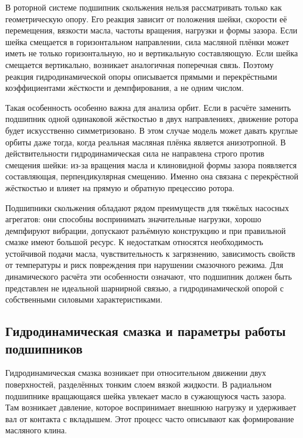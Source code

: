 В роторной системе подшипник скольжения нельзя рассматривать только как геометрическую опору. Его реакция зависит от положения шейки, скорости её перемещения, вязкости масла, частоты вращения, нагрузки и формы зазора. Если шейка смещается в горизонтальном направлении, сила масляной плёнки может иметь не только горизонтальную, но и вертикальную составляющую. Если шейка смещается вертикально, возникает аналогичная поперечная связь. Поэтому реакция гидродинамической опоры описывается прямыми и перекрёстными коэффициентами жёсткости и демпфирования, а не одним числом.

Такая особенность особенно важна для анализа орбит. Если в расчёте заменить подшипник одной одинаковой жёсткостью в двух направлениях, движение ротора будет искусственно симметризовано. В этом случае модель может давать круглые орбиты даже тогда, когда реальная масляная плёнка является анизотропной. В действительности гидродинамическая сила не направлена строго против смещения шейки: из-за вращения масла и клиновидной формы зазора появляется составляющая, перпендикулярная смещению. Именно она связана с перекрёстной жёсткостью и влияет на прямую и обратную прецессию ротора.

Подшипники скольжения обладают рядом преимуществ для тяжёлых насосных агрегатов: они способны воспринимать значительные нагрузки, хорошо демпфируют вибрации, допускают разъёмную конструкцию и при правильной смазке имеют большой ресурс. К недостаткам относятся необходимость устойчивой подачи масла, чувствительность к загрязнению, зависимость свойств от температуры и риск повреждения при нарушении смазочного режима. Для динамического расчёта эти особенности означают, что подшипник должен быть представлен не идеальной шарнирной связью, а гидродинамической опорой с собственными силовыми характеристиками.

\subsection{Гидродинамическая смазка и параметры работы подшипников}

Гидродинамическая смазка возникает при относительном движении двух поверхностей, разделённых тонким слоем вязкой жидкости. В радиальном подшипнике вращающаяся шейка увлекает масло в сужающуюся часть зазора. Там возникает давление, которое воспринимает внешнюю нагрузку и удерживает вал от контакта с вкладышем. Этот процесс часто описывают как формирование масляного клина.


